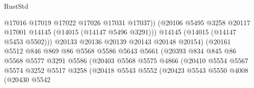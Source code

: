 \begin{lexlean}{RustStd}
\begin{coremodule}
                                        @17016
                                        @17019
                                        @17022
                                        @17026
                                        @17031
                                        @17037))
                                    (@20106
                                      @5495
                                      @3258
                                      @20117
                                      @17001
                                      @14145
                                      (@14015 (@14147 @5496 @3291)))
                                    @14145
                                    (@14015 (@14147 @5453 @5502)))
                                  @20133
                                  @20136
                                  @20139
                                  @20143
                                  @20148
                                  @20154)
                                (@20161
                                  @5512
                                  @846
                                  @869
                                  @86
                                  @5568
                                  @5586
                                  @5643
                                  @5661
                                  (@20393
                                    @834
                                    @845
                                    @86
                                    @5568
                                    @5577
                                    @3291
                                    @5586
                                    (@20403
                                      @5568
                                      @5575
                                      @4866
                                      (@20410
                                        @5554
                                        @5567
                                        @5574
                                        @3252
                                        @5517
                                        @3258
                                        (@20418
                                          @5543
                                          @5552
                                          (@20423
                                            @5543
                                            @5550
                                            @4008
                                            (@20430
                                              @5542

\end{coremodule}
\end{lexlean}
